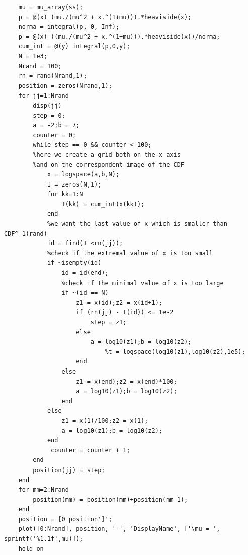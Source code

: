\documentclass[11pt,letterpaper]{article}
\begin{document}
\begin{lstlisting}
	mu = mu_array(ss);    
    p = @(x) (mu./(mu^2 + x.^(1+mu))).*heaviside(x);
    norma = integral(p, 0, Inf);
    p = @(x) ((mu./(mu^2 + x.^(1+mu))).*heaviside(x))/norma;
    cum_int = @(y) integral(p,0,y);    
    N = 1e3;
    Nrand = 100;
    rn = rand(Nrand,1);
    position = zeros(Nrand,1);
    for jj=1:Nrand
        disp(jj)
        step = 0;
        a = -2;b = 7;
        counter = 0;
        while step == 0 && counter < 100;
        %here we create a grid both on the x-axis 
        %and on the correspondent image of the CDF
            x = logspace(a,b,N);
            I = zeros(N,1);
            for kk=1:N
                I(kk) = cum_int(x(kk));
            end
            %we want the last value of x which is smaller than CDF^-1(rand)
            id = find(I <rn(jj));
            %check if the extremal value of x is too small
            if ~isempty(id)
                id = id(end);
                %check if the minimal value of x is too large
                if ~(id == N)
                    z1 = x(id);z2 = x(id+1);
                    if (rn(jj) - I(id)) <= 1e-2
                        step = z1;
                    else
                        a = log10(z1);b = log10(z2);
                            %t = logspace(log10(z1),log10(z2),1e5);
                    end
                else
                    z1 = x(end);z2 = x(end)*100;
                    a = log10(z1);b = log10(z2);
                end
            else
                z1 = x(1)/100;z2 = x(1);
                a = log10(z1);b = log10(z2);
            end
             counter = counter + 1;
        end
        position(jj) = step;
    end
    for mm=2:Nrand
        position(mm) = position(mm)+position(mm-1);
    end
    position = [0 position']';    
    plot([0:Nrand], position, '-', 'DisplayName', ['\mu = ', sprintf('%1.1f',mu)]);
    hold on  
\end{lstlisting}
\end{document}
